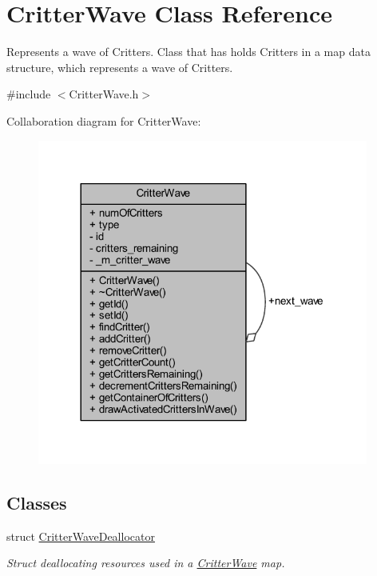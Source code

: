 \hypertarget{class_critter_wave}{\section{Critter\+Wave Class Reference}
\label{class_critter_wave}
}


Represents a wave of Critters. Class that has holds Critters in a map data structure, which represents a wave of Critters.  




{\ttfamily \#include $<$Critter\+Wave.\+h$>$}



Collaboration diagram for Critter\+Wave\+:
\nopagebreak
\begin{figure}[H]
\begin{center}
\leavevmode
\includegraphics[width=308pt]{class_critter_wave__coll__graph}
\end{center}
\end{figure}
\subsection*{Classes}
\begin{DoxyCompactItemize}
\item 
struct \hyperlink{struct_critter_wave_1_1_critter_wave_deallocator}{Critter\+Wave\+Deallocator}
\begin{DoxyCompactList}\small\item\em Struct deallocating resources used in a \hyperlink{class_critter_wave}{Critter\+Wave} map. \end{DoxyCompactList}\end{DoxyCompactItemize}
